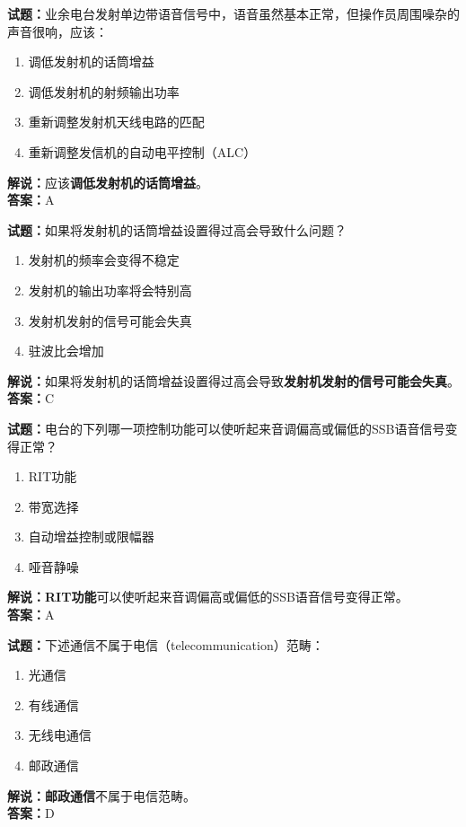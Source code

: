 \documentclass{ctexbook}
\begin{document}
\vspace{1em}

\textbf{试题：}业余电台发射单边带语音信号中，语音虽然基本正常，但操作员周围噪杂的声音很响，应该：
\begin{enumerate}[leftmargin=3em]
  \item 调低发射机的话筒增益
  \item 调低发射机的射频输出功率
  \item 重新调整发射机天线电路的匹配
  \item 重新调整发信机的自动电平控制（ALC）
\end{enumerate}
\noindent\textbf{解说：}应该\textbf{调低发射机的话筒增益}。\\\noindent\textbf{答案：}A

\vspace{1em}

\textbf{试题：}如果将发射机的话筒增益设置得过高会导致什么问题？
\begin{enumerate}[leftmargin=3em]
  \item 发射机的频率会变得不稳定
  \item 发射机的输出功率将会特别高
  \item 发射机发射的信号可能会失真
  \item 驻波比会增加
\end{enumerate}
\noindent\textbf{解说：}如果将发射机的话筒增益设置得过高会导致\textbf{发射机发射的信号可能会失真}。\\\noindent\textbf{答案：}C

\vspace{1em}

\textbf{试题：}电台的下列哪一项控制功能可以使听起来音调偏高或偏低的SSB语音信号变得正常？
\begin{enumerate}[leftmargin=3em]
  \item RIT功能
  \item 带宽选择
  \item 自动增益控制或限幅器
  \item 哑音静噪
\end{enumerate}
\noindent\textbf{解说：}\textbf{RIT功能}可以使听起来音调偏高或偏低的SSB语音信号变得正常。\\\noindent\textbf{答案：}A

\vspace{1em}

\textbf{试题：}下述通信不属于电信（telecommunication）范畴：
\begin{enumerate}[leftmargin=3em]
  \item 光通信
  \item 有线通信
  \item 无线电通信
  \item 邮政通信
\end{enumerate}
\noindent\textbf{解说：}\textbf{邮政通信}不属于电信范畴。\\\noindent\textbf{答案：}D
\end{document}
